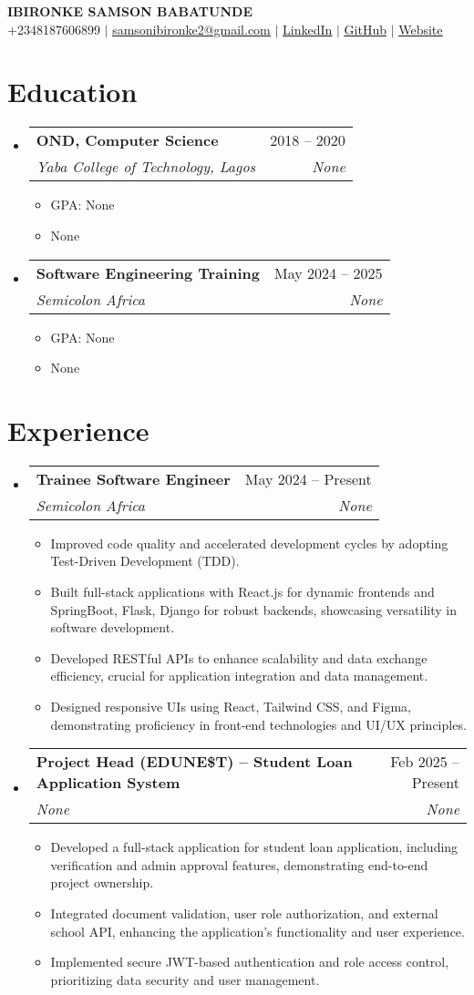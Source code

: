 \documentclass[letterpaper,11pt]{article}
\makeatletter
\newcommand{\resumeItem}[1]{
  \item\small{
    {#1 \vspace{-2pt}}
  }
}
\newcommand{\resumeSubheading}[4]{
  \vspace{-2pt}\item
    \begin{tabular*}{0.97\textwidth}[t]{l@{\extracolsep{\fill}}r}
      \textbf{#1} & #2 \\
      \textit{\small#3} & \textit{\small #4} \\
    \end{tabular*}\vspace{-7pt}
}
\newcommand{\resumeSubHeadingListStart}{\begin{itemize}[leftmargin=0.15in, label={}]}
\newcommand{\resumeSubHeadingListEnd}{\end{itemize}}
\newcommand{\resumeItemListStart}{\begin{itemize}}
\newcommand{\resumeItemListEnd}{\end{itemize}\vspace{-5pt}}
\makeatother
\begin{document}
\begin{center}
    \textbf{\Huge \scshape IBIRONKE SAMSON BABATUNDE} \\ \vspace{1pt}
    \small +2348187606899 $|$ \href{mailto:samsonibironke2@gmail.com}{\underline{samsonibironke2@gmail.com}} $|$ \href{https://None}{\underline{LinkedIn}} $|$ \href{https://None}{\underline{GitHub}} $|$ \href{https://None}{\underline{Website}}
\end{center}

\section{Education}
  \resumeSubHeadingListStart
    \resumeSubheading
      {OND, Computer Science}{2018 -- 2020}
      {Yaba College of Technology, Lagos}{None}
      \resumeItemListStart
        \resumeItem{GPA: None}
        \resumeItem{None}
      \resumeItemListEnd
    \resumeSubheading
      {Software Engineering Training}{May 2024 -- 2025}
      {Semicolon Africa}{None}
      \resumeItemListStart
        \resumeItem{GPA: None}
        \resumeItem{None}
      \resumeItemListEnd
  \resumeSubHeadingListEnd

\section{Experience}
  \resumeSubHeadingListStart
    \resumeSubheading
      {Trainee Software Engineer}{May 2024 -- Present}
      {Semicolon Africa}{None}
      \resumeItemListStart
        \resumeItem{Improved code quality and accelerated development cycles by adopting Test-Driven Development (TDD).}
        \resumeItem{Built full-stack applications with React.js for dynamic frontends and SpringBoot, Flask, Django for robust backends, showcasing versatility in software development.}
        \resumeItem{Developed RESTful APIs to enhance scalability and data exchange efficiency, crucial for application integration and data management.}
        \resumeItem{Designed responsive UIs using React, Tailwind CSS, and Figma, demonstrating proficiency in front-end technologies and UI/UX principles.}
      \resumeItemListEnd
    \resumeSubheading
      {Project Head (EDUNE\$T) -- Student Loan Application System}{Feb 2025 -- Present}
      {None}{None}
      \resumeItemListStart
        \resumeItem{Developed a full-stack application for student loan application, including verification and admin approval features, demonstrating end-to-end project ownership.}
        \resumeItem{Integrated document validation, user role authorization, and external school API, enhancing the application's functionality and user experience.}
        \resumeItem{Implemented secure JWT-based authentication and role access control, prioritizing data security and user management.}
      \resumeItemListEnd
  \resumeSubHeadingListEnd
\end{document}
